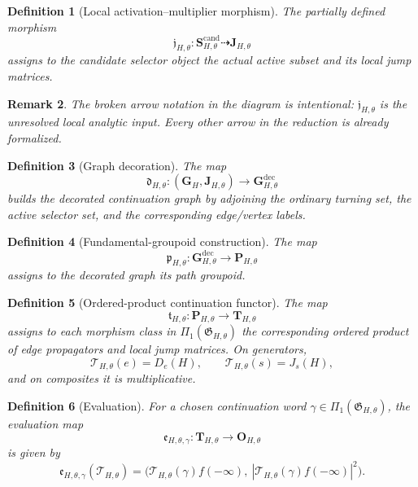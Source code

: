 \documentclass[11pt]{article}
\newcommand{\Graph}{\mathfrak G_{H,\theta}}
\newcommand{\Tfun}{\mathcal T_{H,\theta}}
\newcommand{\PathGpd}{\Pi_1(\Graph)}
\newtheorem{definition}{Definition}[section]
\newtheorem{remark}[definition]{Remark}
\begin{document}
\begin{definition}[Local activation--multiplier morphism]
\label{def:j-map}
The partially defined morphism
\[
\mathfrak j_{H,\theta}:\mathbf S^{\mathrm{cand}}_{H,\theta}\dashrightarrow \mathbf J_{H,\theta}
\]
assigns to the candidate selector object the actual active subset and its local jump matrices.
\end{definition}

\begin{remark}
The broken arrow notation in the diagram is intentional: $\mathfrak j_{H,\theta}$ is the unresolved local analytic input.  Every other arrow in the reduction is already formalized.
\end{remark}

\begin{definition}[Graph decoration]
\label{def:d-map}
The map
\[
\mathfrak d_{H,\theta}: (\mathbf G_H,\mathbf J_{H,\theta})\longrightarrow \mathbf G^{\mathrm{dec}}_{H,\theta}
\]
builds the decorated continuation graph by adjoining the ordinary turning set, the active selector set, and the corresponding edge/vertex labels.
\end{definition}

\begin{definition}[Fundamental-groupoid construction]
\label{def:p-map}
The map
\[
\mathfrak p_{H,\theta}:\mathbf G^{\mathrm{dec}}_{H,\theta}\longrightarrow \mathbf P_{H,\theta}
\]
assigns to the decorated graph its path groupoid.
\end{definition}

\begin{definition}[Ordered-product continuation functor]
\label{def:t-map}
The map
\[
\mathfrak t_{H,\theta}:\mathbf P_{H,\theta}\longrightarrow \mathbf T_{H,\theta}
\]
assigns to each morphism class in $\PathGpd$ the corresponding ordered product of edge propagators and local jump matrices.  On generators,
\[
\Tfun(e)=D_e(H),
\qquad
\Tfun(s)=J_s(H),
\]
and on composites it is multiplicative.
\end{definition}

\begin{definition}[Evaluation]
\label{def:e-map}
For a chosen continuation word $\gamma\in \PathGpd$, the evaluation map
\[
\mathfrak e_{H,\theta,\gamma}:\mathbf T_{H,\theta}\longrightarrow \mathbf O_{H,\theta}
\]
is given by
\[
\mathfrak e_{H,\theta,\gamma}(\Tfun)=\bigl(\Tfun(\gamma)f(-\infty),\ |\Tfun(\gamma)f(-\infty)|^2\bigr).
\]
\end{definition}
\end{document}
